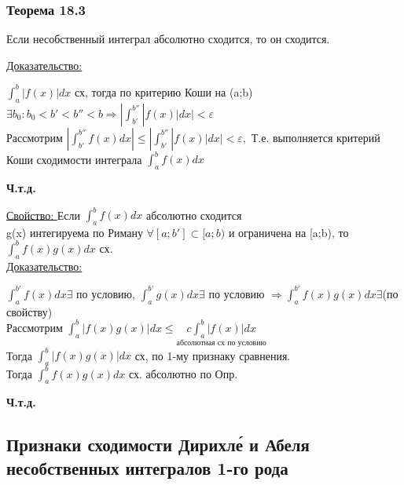 \documentclass[12pt]{article}
\begin{document}
    \subsubsection*{Теорема 18.3}\label{th:6.18.3}
    Если несобственный интеграл абсолютно сходится, то он сходится.\par\noindent
    \underline{Доказательство:}
    \begin{adjustwidth}{1.5em}{1.5em}
        $\int_{a}^{b}|f(x)|dx$ сх, тогда по критерию Коши на (a;b) $\exists b_0:b_0<b'<b''<b \Rightarrow |\int_{b'}^{b''}|f(x)|dx|< \varepsilon$\\
        Рассмотрим $|\int_{b'}^{b''}f(x)dx|\leq |\int_{b'}^{b''}|f(x)|dx|<\varepsilon,$ Т.е. выполняется критерий Коши сходимости интеграла $\int_{a}^{b}f(x)dx$
    \end{adjustwidth}
    \begin{center}
        \textbf{Ч.т.д.}
    \end{center}
    \underline{Свойство: } Если $\int_{a}^{b}f(x)dx$ абсолютно сходится\\
    g(x) интегируема по Риману $\forall [a;b'] \subset [a;b)$ и ограничена на [a;b), то $\int_{a}^{b}f(x)g(x)dx$ сх.\\
    \underline{Доказательство:}
    \begin{adjustwidth}{1.5em}{1.5em}
        $\int_{a}^{b'}f(x)dx \exists $ по условию, $\int_{a}^{b'}g(x)dx \exists$ по условию $\Rightarrow \int_{a}^{b'}f(x)g(x)dx \exists$(по свойству)\\
        Рассмотрим $\int_{a}^{b}|f(x)g(x)|dx \leq \underset{\text{абсолютная сх по условию}}{c\int_{a}^{b}|f(x)|dx}$\\
        Тогда $\int_{a}^{b}|f(x)g(x)|dx$ сх, по 1-му признаку сравнения.\\
        Тогда $\int_{a}^{b}f(x)g(x)dx$ сх. абсолютно по Опр.
    \end{adjustwidth}
    \begin{center}
        \textbf{Ч.т.д.}
    \end{center}
    \subsection{Признаки сходимости Дирихле́ и Абеля несобственных интегралов 1-го рода}
\end{document}
